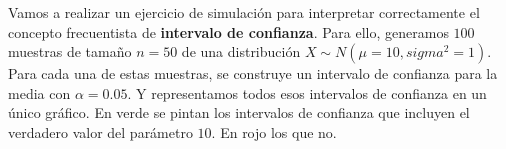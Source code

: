 \documentclass[
  letterpaper,
  DIV=11,
  numbers=noendperiod]{scrreprt}
\begin{document}
\begin{tcolorbox}[enhanced jigsaw, arc=.35mm, breakable, coltitle=black, left=2mm, opacityback=0, bottomtitle=1mm, colbacktitle=quarto-callout-tip-color!10!white, title=\textcolor{quarto-callout-tip-color}{\faLightbulb}\hspace{0.5em}{Simulación Intervalo de Confianza}, titlerule=0mm, colback=white, colframe=quarto-callout-tip-color-frame, bottomrule=.15mm, rightrule=.15mm, opacitybacktitle=0.6, toptitle=1mm, toprule=.15mm, leftrule=.75mm]

Vamos a realizar un ejercicio de simulación para interpretar
correctamente el concepto frecuentista de \textbf{intervalo de
confianza}. Para ello, generamos \(100\)muestras de tamaño \(n=50\) de
una distribución \(X\sim N(\mu=10,sigma^2=1)\). Para cada una de estas
muestras, se construye un intervalo de confianza para la media con
\(\alpha=0.05\). Y representamos todos esos intervalos de confianza en
un único gráfico. En verde se pintan los intervalos de confianza que
incluyen el verdadero valor del parámetro \(10\). En rojo los que no.


\end{tcolorbox}
\end{document}
